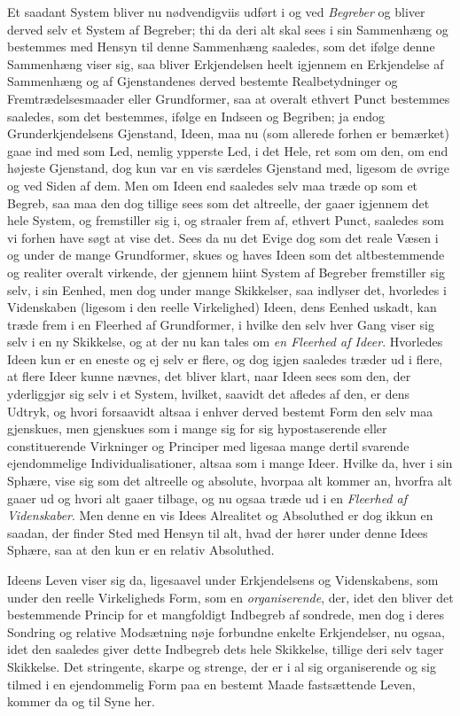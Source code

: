 \documentclass[12pt,a4paper]{book}
\newcommand{\apage}[1]{\marginnote{\footnotesize\textit{[#1]}}}
\begin{document}
Et saadant System bliver nu nødvendigviis udført i og ved \emph{Begreber} og
bliver derved selv et System af Begreber; thi da deri alt skal sees i sin
Sammenhæng og bestemmes med Hensyn til denne Sammenhæng saaledes, som det ifølge
denne Sammenhæng viser sig, saa bliver Erkjendelsen heelt igjennem en Erkjendelse
af Sammenhæng og af Gjenstandenes derved bestemte Realbetydninger og
Fremtrædelsesmaader eller Grundformer, saa at overalt ethvert Punct bestemmes
saaledes, som det bestemmes, ifølge en Indseen og Begriben; ja endog
Grunderkjendelsens Gjenstand, Ideen, maa nu (som allerede forhen er bemærket) \apage{134} 
gaae ind med som Led, nemlig ypperste Led, i det Hele, ret som om den, om end
højeste Gjenstand, dog kun var en vis særdeles Gjenstand med, ligesom de øvrige og
ved Siden af dem. Men om Ideen end saaledes selv maa træde op som et Begreb, saa
maa den dog tillige sees som det altreelle, der gaaer igjennem det hele System, og
fremstiller sig i, og straaler frem af, ethvert Punct, saaledes som vi forhen have
søgt at vise det. Sees da nu det Evige dog som det reale Væsen i og under de mange
Grundformer, skues og haves Ideen som det altbestemmende og realiter overalt
virkende, der gjennem hiint System af Begreber fremstiller sig selv, i sin Eenhed,
men dog under mange Skikkelser, saa indlyser det, hvorledes i Videnskaben (ligesom
i den reelle Virkelighed) Ideen, dens Eenhed uskadt, kan træde frem i en
Fleerhed af Grundformer, i hvilke den selv hver Gang viser sig selv i en ny
Skikkelse, og at der nu kan tales om \emph{en Fleerhed af Ideer}. Hvorledes Ideen
kun er en eneste og ej selv er flere, og dog igjen saaledes træder ud i flere, at
flere Ideer kunne nævnes, det bliver klart, naar Ideen sees som den, der
yderliggjør sig selv i et System, hvilket, saavidt det afledes af den, er dens
Udtryk, og hvori forsaavidt altsaa i enhver derved bestemt Form den selv maa
gjenskues, men gjenskues som i mange sig for sig hypostaserende eller
constituerende Virkninger og Principer med ligesaa \apage{135} mange dertil svarende
ejendommelige Individualisationer, altsaa som i mange Ideer. Hvilke da, hver i sin
Sphære, vise sig som det altreelle og absolute, hvorpaa alt kommer an, hvorfra alt
gaaer ud og hvori alt gaaer tilbage, og nu ogsaa træde ud i en \emph{Fleerhed af
Videnskaber}. Men denne en vis Idees Alrealitet og Absoluthed er dog ikkun en
saadan, der finder Sted med Hensyn til alt, hvad der hører under denne Idees
Sphære, saa at den kun er en relativ Absoluthed.

Ideens Leven viser sig da, ligesaavel under Erkjendelsens og Videnskabens, som
under den reelle Virkeligheds Form, som en \emph{organiserende}, der, idet den
bliver det bestemmende Princip for et mangfoldigt Indbegreb af sondrede, men dog i
deres Sondring og relative Modsætning nøje forbundne enkelte Erkjendelser, nu
ogsaa, idet den saaledes giver dette Indbegreb dets hele Skikkelse, tillige deri
selv tager Skikkelse. Det stringente, skarpe og strenge, der er i al sig
organiserende og sig tilmed i en ejendommelig Form paa en bestemt Maade
fastsættende Leven, kommer da og til Syne her.
\end{document}

